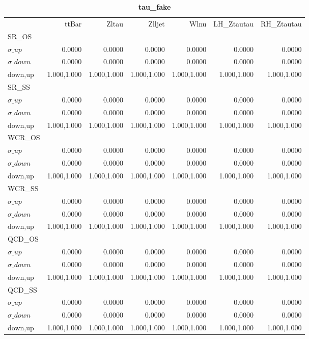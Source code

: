 \documentclass[11pt,oneside,a4paper]{article}
\begin{document}
\begin{table}
\centering
\caption{\bf{tau\_fake}}
\begin{tabular}{lrrrrrr}
 & ttBar & Zltau & Zlljet & Wlnu & LH\_Ztautau & RH\_Ztautau \\
SR\_OS &  &  &  &  &  &  \\
$\sigma\_up$ & 0.0000 & 0.0000 & 0.0000 & 0.0000 & 0.0000 & 0.0000 \\
$\sigma\_down$ & 0.0000 & 0.0000 & 0.0000 & 0.0000 & 0.0000 & 0.0000 \\
down,up & 1.000,1.000 & 1.000,1.000 & 1.000,1.000 & 1.000,1.000 & 1.000,1.000 & 1.000,1.000 \\

\hline
SR\_SS &  &  &  &  &  &  \\
$\sigma\_up$ & 0.0000 & 0.0000 & 0.0000 & 0.0000 & 0.0000 & 0.0000 \\
$\sigma\_down$ & 0.0000 & 0.0000 & 0.0000 & 0.0000 & 0.0000 & 0.0000 \\
down,up & 1.000,1.000 & 1.000,1.000 & 1.000,1.000 & 1.000,1.000 & 1.000,1.000 & 1.000,1.000 \\

\hline
WCR\_OS &  &  &  &  &  &  \\
$\sigma\_up$ & 0.0000 & 0.0000 & 0.0000 & 0.0000 & 0.0000 & 0.0000 \\
$\sigma\_down$ & 0.0000 & 0.0000 & 0.0000 & 0.0000 & 0.0000 & 0.0000 \\
down,up & 1.000,1.000 & 1.000,1.000 & 1.000,1.000 & 1.000,1.000 & 1.000,1.000 & 1.000,1.000 \\

\hline
WCR\_SS &  &  &  &  &  &  \\
$\sigma\_up$ & 0.0000 & 0.0000 & 0.0000 & 0.0000 & 0.0000 & 0.0000 \\
$\sigma\_down$ & 0.0000 & 0.0000 & 0.0000 & 0.0000 & 0.0000 & 0.0000 \\
down,up & 1.000,1.000 & 1.000,1.000 & 1.000,1.000 & 1.000,1.000 & 1.000,1.000 & 1.000,1.000 \\

\hline
QCD\_OS &  &  &  &  &  &  \\
$\sigma\_up$ & 0.0000 & 0.0000 & 0.0000 & 0.0000 & 0.0000 & 0.0000 \\
$\sigma\_down$ & 0.0000 & 0.0000 & 0.0000 & 0.0000 & 0.0000 & 0.0000 \\
down,up & 1.000,1.000 & 1.000,1.000 & 1.000,1.000 & 1.000,1.000 & 1.000,1.000 & 1.000,1.000 \\

\hline
QCD\_SS &  &  &  &  &  &  \\
$\sigma\_up$ & 0.0000 & 0.0000 & 0.0000 & 0.0000 & 0.0000 & 0.0000 \\
$\sigma\_down$ & 0.0000 & 0.0000 & 0.0000 & 0.0000 & 0.0000 & 0.0000 \\
down,up & 1.000,1.000 & 1.000,1.000 & 1.000,1.000 & 1.000,1.000 & 1.000,1.000 & 1.000,1.000 \\

\hline
\end{tabular}
\end{table}
\end{document}
